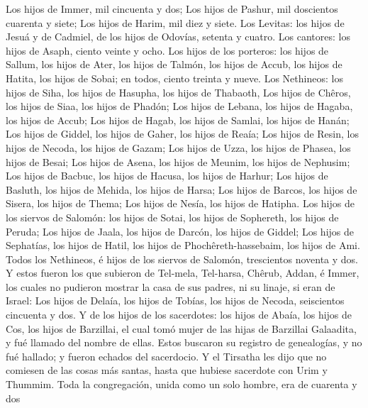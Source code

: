 Los hijos de Immer, mil cincuenta y dos;  Los hijos de
Pashur, mil doscientos cuarenta y siete;  Los hijos de
Harim, mil diez y siete.  Los Levitas: los hijos de Jesuá y
de Cadmiel, de los hijos de Odovías, setenta y cuatro.  Los
cantores: los hijos de Asaph, ciento veinte y ocho.  Los
hijos de los porteros: los hijos de Sallum, los hijos de Ater, los hijos
de Talmón, los hijos de Accub, los hijos de Hatita, los hijos de Sobai;
en todos, ciento treinta y nueve.  Los Nethineos: los hijos
de Siha, los hijos de Hasupha, los hijos de Thabaoth,  Los
hijos de Chêros, los hijos de Siaa, los hijos de Phadón; 
Los hijos de Lebana, los hijos de Hagaba, los hijos de Accub;
 Los hijos de Hagab, los hijos de Samlai, los hijos de
Hanán;  Los hijos de Giddel, los hijos de Gaher, los hijos
de Reaía;  Los hijos de Resin, los hijos de Necoda, los
hijos de Gazam;  Los hijos de Uzza, los hijos de Phasea,
los hijos de Besai;  Los hijos de Asena, los hijos de
Meunim, los hijos de Nephusim;  Los hijos de Bacbuc, los
hijos de Hacusa, los hijos de Harhur;  Los hijos de
Basluth, los hijos de Mehida, los hijos de Harsa;  Los
hijos de Barcos, los hijos de Sisera, los hijos de Thema; 
Los hijos de Nesía, los hijos de Hatipha.  Los hijos de los
siervos de Salomón: los hijos de Sotai, los hijos de Sophereth, los
hijos de Peruda;  Los hijos de Jaala, los hijos de Darcón,
los hijos de Giddel;  Los hijos de Sephatías, los hijos de
Hatil, los hijos de Phochêreth-hassebaim, los hijos de Ami.
 Todos los Nethineos, é hijos de los siervos de Salomón,
trescientos noventa y dos.  Y estos fueron los que subieron
de Tel-mela, Tel-harsa, Chêrub, Addan, é Immer, los cuales no pudieron
mostrar la casa de sus padres, ni su linaje, si eran de Israel:
 Los hijos de Delaía, los hijos de Tobías, los hijos de
Necoda, seiscientos cincuenta y dos.  Y de los hijos de los
sacerdotes: los hijos de Abaía, los hijos de Cos, los hijos de
Barzillai, el cual tomó mujer de las hijas de Barzillai Galaadita, y fué
llamado del nombre de ellas.  Estos buscaron su registro de
genealogías, y no fué hallado; y fueron echados del sacerdocio.
 Y el Tirsatha les dijo que no comiesen de las cosas más
santas, hasta que hubiese sacerdote con Urim y Thummim. 
Toda la congregación, unida como un solo hombre, era de cuarenta y dos
